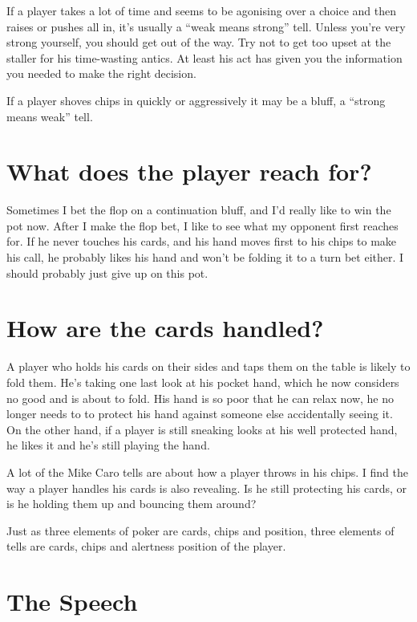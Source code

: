 If a player takes a lot of time and seems to be agonising over a choice
and then raises or pushes all in, it's usually a ``weak means strong'' tell.
Unless you're very strong yourself, you should get out
of the way. Try not to get too upset at the staller for 
his time-wasting antics. At least his act has given you the
information you needed to make the right decision.

If a player shoves chips in quickly or aggressively it may be a bluff,
a ``strong means weak'' tell.

\section{What does the player reach for?}

Sometimes I bet the flop on a continuation bluff, and I'd really like
to win the pot now. After I make the flop bet, I like to see what
my opponent first reaches for. If he never touches his cards, and his
hand moves first to his chips to make his call, he probably likes his
hand and won't be folding it to a turn bet either. I should probably
just give up on this pot.

\section{How are the cards handled?}

A player who holds his cards on their sides and taps them on
the table is likely to fold them. He's taking one last look
at his pocket hand, which he now considers no good and is about
to fold. His hand is so poor that he can relax now, he no longer
needs to to protect his hand against someone else accidentally seeing it. 
On the other hand, if a player is still sneaking looks at his 
well protected hand, he likes it and he's still playing the hand.

A lot of the Mike Caro tells are about how a player 
throws in his chips. I find the way a player
handles his cards is also revealing. Is he still protecting
his cards, or is he holding them up and bouncing them around?

Just as three elements of poker are cards, chips and position,
three elements of tells are cards, chips and alertness position
of the player.

\section{The Speech}

